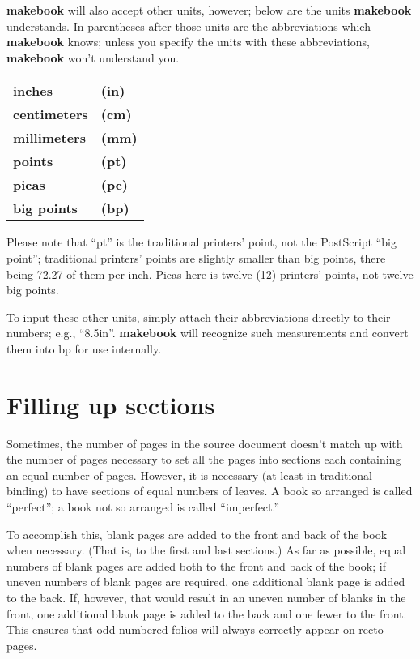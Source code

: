\documentclass[12pt,twoside,final]{extarticle}
\begin{document}
\textbf{makebook} will also accept other units, however; below are the units \textbf{makebook} understands. In parentheses after those units are the abbreviations which \textbf{makebook} knows; unless you specify the units with these abbreviations, \textbf{makebook} won't understand you. \\

\begin{tabular}{ll}
\textbf{inches} & \textbf{(in)} \\
\textbf{centimeters} & \textbf{(cm)} \\
\textbf{millimeters} & \textbf{(mm)} \\
\textbf{points} & \textbf{(pt)} \\
\textbf{picas} & \textbf{(pc)} \\
\textbf{big points} & \textbf{(bp)} \\
\end{tabular}
\vspace{12pt}

Please note that ``pt'' is the traditional printers' point, not the PostScript ``big point''; traditional printers' points are slightly smaller than big points, there being 72.27 of them per inch. Picas here is twelve (12) printers' points, not twelve big points.

To  input these other units, simply attach their abbreviations directly to their numbers; e.g., ``8.5in''. \textbf{makebook} will recognize such measurements and convert them into bp for use internally.
\section{Filling up sections}
Sometimes, the number of pages in the source document doesn't match up with the number of pages necessary to set all  the  pages  into  sections each containing an equal number of pages. However, it is necessary (at least in traditional binding) to have sections of equal numbers of leaves. A book so arranged  is  called  ``perfect'';  a book not so arranged is called ``imperfect.''

To accomplish this, blank pages are added to the front and back of the book when necessary. (That is, to the first and last sections.) As far as possible, equal numbers of blank pages are added both to the front and back of the book; if uneven numbers of blank pages are required, one additional blank page is added to the back.  If, however, that would result in an uneven number of blanks in the front, one additional blank page is added to the back  and  one  fewer to the front. This ensures that odd-numbered folios will always correctly appear on recto pages.
\end{document}
